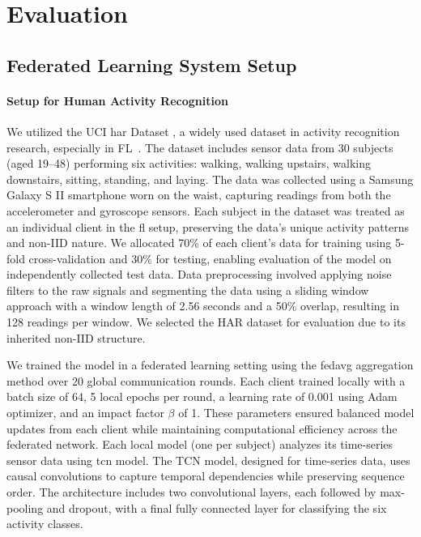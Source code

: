 \section{Evaluation}\label{sec:eval}



\subsection{Federated Learning System Setup}

\paragraph{\textbf{Setup for Human Activity Recognition}} We utilized the UCI \ac{har} Dataset \cite{human_activity_recognition_using_smartphones_240}, a widely used dataset in activity recognition research, especially in FL~\cite{har2,har3}.
The dataset includes sensor data from 30 subjects (aged 19–48) performing six activities: walking, walking upstairs, walking downstairs, sitting, standing, and laying. The data was collected using a Samsung Galaxy S II smartphone worn on the waist, capturing readings from both the accelerometer and gyroscope sensors. Each subject in the dataset was treated as an individual client in the \ac{fl} setup, preserving the data's unique activity patterns and non-IID nature. We allocated 70\% of each client's data for training using 5-fold cross-validation and 30\% for testing, enabling evaluation of the model on independently collected test data. Data preprocessing involved applying noise filters to the raw signals and segmenting the data using a sliding window approach with a window length of 2.56 seconds and a 50\% overlap, resulting in 128 readings per window. We selected the HAR dataset for evaluation \sysname due to its inherited non-IID structure. 

We trained the model in a federated learning setting using the \ac{fedavg} aggregation method over 20 global communication rounds. Each client trained locally with a batch size of 64, 5 local epochs per round, a learning rate of 0.001 using Adam optimizer, and an impact factor $\beta$ of 1. These parameters ensured balanced model updates from each client while maintaining computational efficiency across the federated network. Each local model (one per subject) analyzes its time-series sensor data using \ac{tcn} model\cite{bai2018empirical}. 
The TCN model, designed for time-series data, uses causal convolutions to capture temporal dependencies while preserving sequence order. The architecture includes two convolutional layers, each followed by max-pooling and dropout, with a final fully connected layer for classifying the six activity classes.



